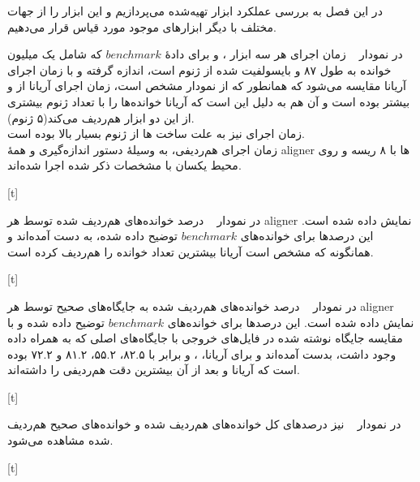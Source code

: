 

در این فصل به بررسی عملکرد ابزار تهیه‌شده می‌پردازیم و این ابزار را از جهات مختلف با دیگر ابزارهای موجود مورد قیاس قرار می‌دهیم.


در نمودار ~ زمان اجرای هر سه ابزار ،  و  برای دادهٔ $benchmark$ که شامل یک میلیون خوانده به طول ۸۷ و بایسولفیت شده از ژنوم  است، اندازه گرفته و با زمان اجرای آریانا مقایسه می‌شود که همانطور که از نمودار مشخص است، زمان اجرای آریانا از  و  بیشتر بوده است و آن هم به دلیل این است که آریانا خوانده‌ها را با تعداد ژنوم بیشتری از این دو ابزار هم‌ردیف می‌کند(۵ ژنوم).
\\
زمان اجرای  نیز به علت ساخت ها از ژنوم بسیار بالا بوده است.
\\
زمان اجرای هم‌ردیفی، به وسیلهٔ دستور  اندازه‌گیری و همهٔ aligner ها با ۸ ریسه و روی محیط یکسان با مشخصات ذکر شده اجرا شده‌اند.

[t]


در نمودار ~ درصد خوانده‌های هم‌ردیف شده توسط هر aligner نمایش داده شده است. این درصدها برای خوانده‌های $benchmark$ توضیح داده شده، به دست آمده‌اند و همانگونه که مشخص است آریانا بیشترین تعداد خوانده را هم‌ردیف کرده است.

[t]

در نمودار ~ درصد خوانده‌های هم‌ردیف شده به جایگاه‌های صحیح توسط هر aligner نمایش داده شده است. این درصدها برای خوانده‌های $benchmark$ توضیح داده شده و با مقایسه جایگاه نوشته شده در فایل‌های خروجی با جایگاه‌های اصلی که به همراه داده وجود داشت، بدست آمده‌اند و برای آریانا، ،  و  برابر با ۸۲.۵، ۵۵.۲، ۸۱.۲ و ۷۲.۲ بوده است که آریانا و بعد از آن  بیشترین دقت هم‌ردیفی را داشته‌اند.


[t]


در نمودار ~ نیز درصدهای کل خوانده‌های هم‌ردیف شده و خوانده‌های صحیح هم‌ردیف شده مشاهده می‌شود.


[t]


